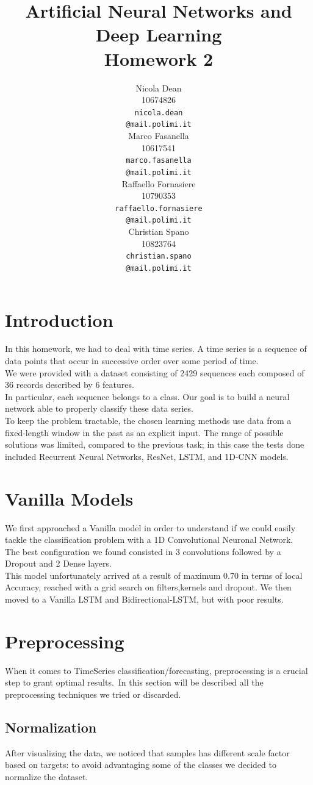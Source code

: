\documentclass[11pt]{article}
\title{Artificial Neural Networks and Deep Learning \\
Homework 2}
\author{
  Nicola Dean \\
  10674826 \\
  {\tt nicola.dean \\
  \tt @mail.polimi.it} \\\And
  Marco Fasanella \\
  10617541 \\
  {\tt marco.fasanella \\
  \tt @mail.polimi.it} \\\And
  Raffaello Fornasiere \\
    10790353 \\
    {\tt raffaello.fornasiere \\
    \tt @mail.polimi.it} \\\And
  Christian Spano \\
  10823764 \\
  {\tt christian.spano \\
  \tt @mail.polimi.it} \\}
\date{}
\begin{document}
\maketitle


\section{Introduction}
In this homework, we had to deal with time series. A time series is a sequence of data points that occur in successive order over some period of time.\\
We were provided with a dataset consisting of 2429 sequences each composed of 36 records described by 6 features.\\
In particular, each sequence belongs to a class. Our goal is to build a neural network able to properly classify these data series.\\[0.1cm]
To keep the problem tractable, the chosen learning methods use data from a fixed-length window in the past as an explicit input. The range of possible solutions was limited, compared to the previous task; in this case the tests done included Recurrent Neural Networks, ResNet, LSTM, and 1D-CNN models.
\section{Vanilla Models}

We first approached a Vanilla model in order to understand if we could easily tackle the classification problem with a 1D Convolutional Neuronal Network.\\
The best configuration we found consisted in 3 convolutions followed by a Dropout and 2 Dense layers.\\
This model unfortunately arrived at a result of maximum 0.70 in terms of local Accuracy, reached with a grid search on filters,kernels and dropout. We then moved to a Vanilla LSTM and Bidirectional-LSTM, but with poor results.

\section{Preprocessing}
When it comes to TimeSeries classification/forecasting, preprocessing is a crucial step to grant optimal results.\
In this section will be described all the preprocessing techniques we tried or discarded.
\subsection{Normalization}
After visualizing the data, we noticed that samples has different scale factor based on targets: to avoid advantaging some of the classes we decided to normalize the dataset.
\end{document}
